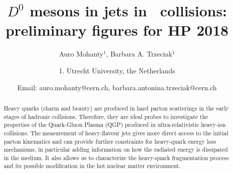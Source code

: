 \documentclass[ALICE,manyauthors]{ALICE_analysis_notes}
\begin{document}
%
%
%
\begin{titlepage}
%
\PHdate{\today}
%
\title{$D^{0}$ mesons in jets in \pp\ collisions: preliminary figures for HP 2018}
%
\author{Auro Mohanty$^{1}$, Barbara A. Trzeciak$^{1}$}
\author{
1. Utrecht University, the Netherlands\\
}
\author{Email: auro.mohanty@cern.ch, barbara.antonina.trzeciak@cern.ch}
%
%
\begin{abstract}

Heavy quarks (charm and beauty) are produced in hard parton scatterings in the early stages of hadronic collisions. Therefore, they are ideal probes to investigate the properties of the Quark-Gluon Plasma (QGP) produced in ultra-relativistic heavy-ion collisions. 
The measurement of heavy-flavour jets gives more direct access to the initial parton kinematics and can provide further constraints for heavy-quark energy loss mechanisms, in particular adding information on how the radiated energy is dissipated in the medium. It also allows us to characterize the heavy-quark fragmentation process and its possible modification in the hot nuclear matter environment. 
 

\end{abstract}
\end{titlepage}
\end{document}
